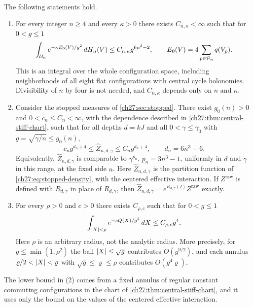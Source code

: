 \begin{theorem}\label{ch27:thm:sharp-normalizer}
The following statements hold.
\begin{enumerate}
\item For every integer $n\ge4$ and every $\kappa>0$ there exists $C_{n,\kappa}<\infty$ such that for $0<g\le1$
\[
 \int_{\mathcal U_{n}}e^{-\kappa E_0(V)/g^2}\,dH_n(V)\le C_{n,\kappa}g^{6n^3-2},\qquad E_0(V)=4\sum_{p\in\mathcal P_{n}}q(V_p).
\]
This is an integral over the whole configuration space, including neighborhoods of all eight flat configurations with central cycle holonomies. Divisibility of $n$ by four is not needed, and $C_{n,\kappa}$ depends only on $n$ and $\kappa$.
\item Consider the stopped measures of \cref{ch27:sec:stopped}. There exist $g_0(n)>0$ and $0<c_n\le C_n<\infty$, with the dependence described in \cref{ch27:thm:central-stiff-chart}, such that for all depths $d=kJ$ and all $0<\gamma\le\gamma_0$ with $g=\sqrt{\gamma/n}\le g_0(n)$,
\[
 c_ng^{d_n+4}\le\widehat Z_{n,d,\gamma}\le C_ng^{d_n+4},\qquad d_n=6n^3-6.
\]
Equivalently, $\widehat Z_{n,d,\gamma}$ is comparable to $\gamma^{p_n}$, $p_n=3n^3-1$, uniformly in $d$ and $\gamma$ in this range, at the fixed side $n$. Here $\widehat Z_{n,d,\gamma}$ is the partition function of \eqref{ch27:eq:stopped-density}, with the centered effective interaction. If $Z^{\mathrm{raw}}$ is defined with $R_{d,\gamma}$ in place of $\overline R_{d,\gamma}$, then $\widehat Z_{n,d,\gamma}=e^{R_{d,\gamma}(I)}Z^{\mathrm{raw}}$ exactly.
\item For every $\rho>0$ and $c>0$ there exists $C_{\rho,c}$ such that for $0<g\le1$
\[
 \int_{\lvert X\rvert<\rho}e^{-cQ(X)/g^2}\,dX\le C_{\rho,c}g^4.
\]
Here $\rho$ is an arbitrary radius, not the analytic radius. More precisely, for $g\le\min(1,\rho^2)$ the ball $\lvert X\rvert\le\sqrt g$ contributes $O(g^{9/2})$, and each annulus $\varrho/2<\lvert X\rvert<\varrho$ with $\sqrt g\le\varrho\le\rho$ contributes $O(g^4\varrho)$.
\end{enumerate}
\end{theorem}

The lower bound in (2) comes from a fixed annulus of regular constant commuting configurations in the chart of \cref{ch27:thm:central-stiff-chart}, and it uses only the bound on the values of the centered effective interaction.

